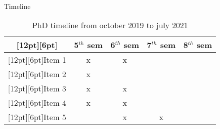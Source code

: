 \begin{frame}{Timeline}
\begin{table}[!htp]
	\caption{PhD timeline from october 2019 to july 2021}\label{crono}
	\setlength{\tabcolsep}{4pt}
	\centering
	\begin{tabular}{||c|c|c|c|c||}%
		\hline
		\raisebox{0pt}[12pt][6pt]{} & 
		\multicolumn{1}{|c|}{5$^{th}$  sem}  &
		\multicolumn{1}{|c|}{6$^{th}$  sem}  &
		\multicolumn{1}{|c|}{7$^{th}$  sem}  &
		\multicolumn{1}{|c||}{8$^{th}$  sem} \\
		\hline \hline
		\raisebox{0pt}[12pt][6pt]{Item 1}   &  x   	& x &  & \\
		\hline
		\raisebox{0pt}[12pt][6pt]{Item 2}   &  x 	&  	&  &\\
		\hline
		\raisebox{0pt}[12pt][6pt]{Item 3}   &  x    & x &  & \\
		\hline
		\raisebox{0pt}[12pt][6pt]{Item 4}   &  x    & x &  & \\
		\hline
		\raisebox{0pt}[12pt][6pt]{Item 5}   &      	& x & x & \\
		\hline
	\end{tabular}
\end{table}
\end{frame}

